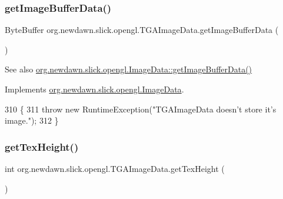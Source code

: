 \subsubsection{\texorpdfstring{get\+Image\+Buffer\+Data()}{getImageBufferData()}}
{\footnotesize\ttfamily Byte\+Buffer org.\+newdawn.\+slick.\+opengl.\+T\+G\+A\+Image\+Data.\+get\+Image\+Buffer\+Data (\begin{DoxyParamCaption}{ }\end{DoxyParamCaption})\hspace{0.3cm}{\ttfamily [inline]}}

\begin{DoxySeeAlso}{See also}
\mbox{\hyperlink{interfaceorg_1_1newdawn_1_1slick_1_1opengl_1_1_image_data_a7b15d49f552cad075bb1179668ce5250}{org.\+newdawn.\+slick.\+opengl.\+Image\+Data\+::get\+Image\+Buffer\+Data()}} 
\end{DoxySeeAlso}


Implements \mbox{\hyperlink{interfaceorg_1_1newdawn_1_1slick_1_1opengl_1_1_image_data_a7b15d49f552cad075bb1179668ce5250}{org.\+newdawn.\+slick.\+opengl.\+Image\+Data}}.


\begin{DoxyCode}
310                                            \{
311         \textcolor{keywordflow}{throw} \textcolor{keyword}{new} RuntimeException(\textcolor{stringliteral}{"TGAImageData doesn't store it's image."});
312     \}
\end{DoxyCode}
\mbox{\label{classorg_1_1newdawn_1_1slick_1_1opengl_1_1_t_g_a_image_data_a787a45da7ec0d249ff4ab5db7784d535}} 
\subsubsection{\texorpdfstring{get\+Tex\+Height()}{getTexHeight()}}
{\footnotesize\ttfamily int org.\+newdawn.\+slick.\+opengl.\+T\+G\+A\+Image\+Data.\+get\+Tex\+Height (\begin{DoxyParamCaption}{ }\end{DoxyParamCaption})\hspace{0.3cm}{\ttfamily [inline]}}

